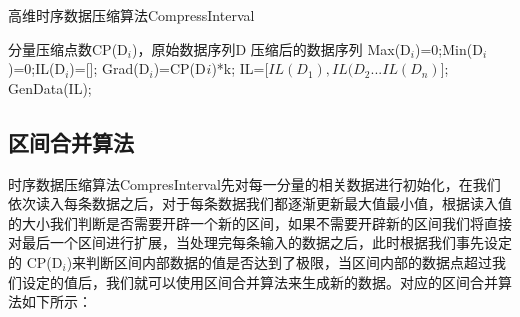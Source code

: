 \begin{algorithm}
\caption{高维时序数据压缩算法CompressInterval}
\label{alg1}
\begin{algorithmic}[1]
\REQUIRE 分量压缩点数CP(D$_{i}$)，原始数据序列D 
\ENSURE 压缩后的数据序列
\STATE Max(D$_{i}$)=0;Min(D$_{i}$)=0;IL(D$_{i}$)=[];
\STATE Grad(D$_{i}$)=CP(D$_{}i$)*k;
\ENDFOR
{}
\ENDWHILE
\STATE IL=[$ IL(D_{1}),IL(D_{2}...IL(D_{n}) $];
\RETURN GenData(IL);
\end{algorithmic}
\end{algorithm}


\subsection{区间合并算法}
\label{section 3.15}
时序数据压缩算法CompresInterval先对每一分量的相关数据进行初始化，在我们依次读入每条数据之后，对于每条数据我们都逐渐更新最大值最小值，根据读入值
的大小我们判断是否需要开辟一个新的区间，如果不需要开辟新的区间我们将直接对最后一个区间进行扩展，当处理完每条输入的数据之后，此时根据我们事先设定的
CP(D$_{i}$)来判断区间内部数据的值是否达到了极限，当区间内部的数据点超过我们设定的值后，我们就可以使用区间合并算法来生成新的数据。对应的区间合并算法如下所示：

